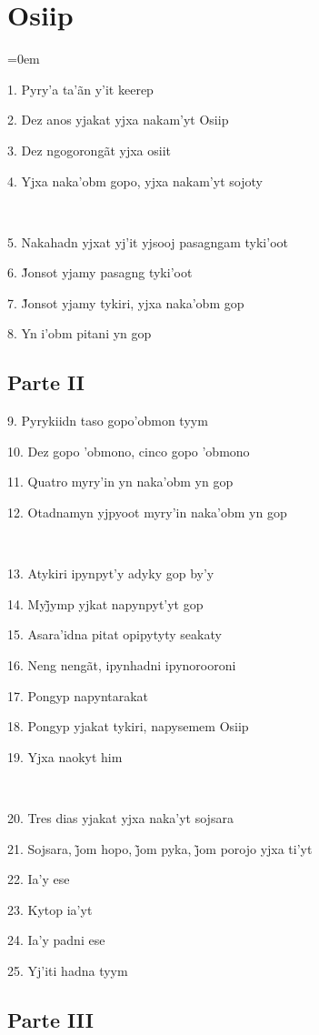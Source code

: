 \chapter*{Osiip}\parindent=0em

1. Pyry'a ta'ãn y'it keerep

2. Dez anos yjakat yjxa nakam'yt Osiip

3. Dez ngogorongãt yjxa osiit

4. Yjxa naka'obm gopo, yjxa nakam'yt sojoty

~

5. Nakahadn yjxat yj'it yjsooj pasagngam tyki'oot

6. J̃onsot yjamy pasagng tyki’oot

7. J̃onsot yjamy tykiri, yjxa naka’obm gop

8. Yn i’obm pitani yn gop

\section{Parte II}

9. Pyrykiidn taso gopo'obmon tyym

10. Dez gopo 'obmono, cinco gopo 'obmono

11. Quatro myry'in yn naka'obm yn gop

12. Otadnamyn yjpyoot myry'in naka'obm yn gop

~

13. Atykiri ipynpyt'y adyky gop by'y

14. Myj̃ymp yjkat napynpyt’yt gop

15. Asara'idna pitat opipytyty seakaty

16. Neng nengãt, ipynhadni ipynorooroni

17. Pongyp napyntarakat

18. Pongyp yjakat tykiri, napysemem Osiip

19. Yjxa naokyt him

~

20. Tres dias yjakat yjxa naka'yt sojsara

21. Sojsara, j̃om hopo, j̃om pyka, j̃om porojo yjxa ti’yt

22. Ia'y ese

23. Kytop ia'yt

24. Ia'y padni ese

25. Yj'iti hadna tyym

\section{Parte III}

